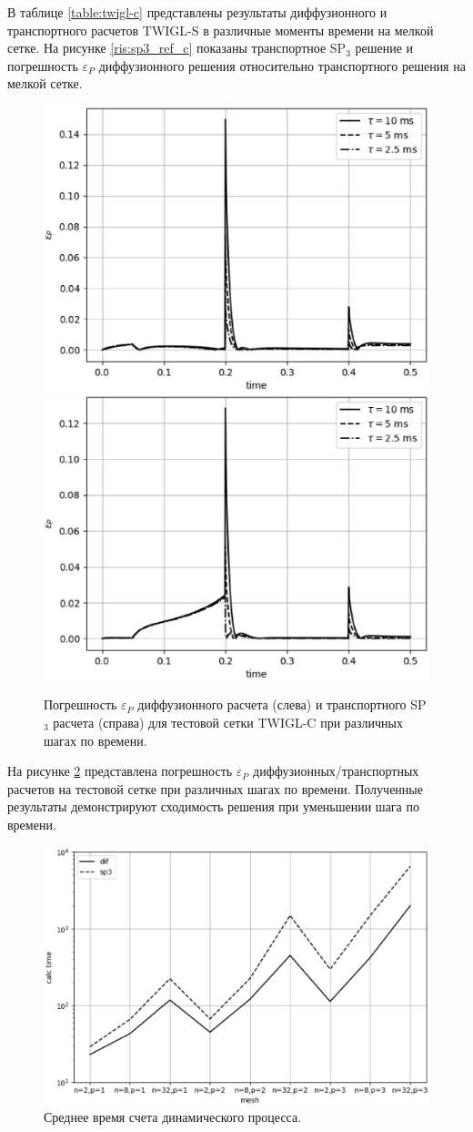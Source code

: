 \documentclass{crm-article}
\begin{document}
В таблице \ref{table:twigl-c} представлены результаты диффузионного и транспортного расчетов TWIGL-S в различные моменты времени на мелкой сетке.
На рисунке \ref{ris:sp3_ref_c} показаны транспортное SP$_3$ решение и погрешность $\varepsilon_P$ диффузионного решения относительно транспортного решения на мелкой сетке. 

\begin{figure}[ht]
\begin{center}
	\includegraphics[width=0.4\linewidth]{dif_tau_c.eps}\hspace{20pt}
	\includegraphics[width=0.4\linewidth]{sp3_tau_c.eps}\\
	\caption{\label{image:canonsummary} Погрешность $\varepsilon_P$ диффузионного расчета (слева) и  транспортного SP$_3$ расчета (справа) для тестовой сетки TWIGL-C при различных шагах по времени.}
	\label{ris:tau_c}
\end{center}
\end{figure}

На рисунке \ref{ris:tau_c} представлена погрешность $\varepsilon_P$ диффузионных/транспортных расчетов на тестовой сетке при различных шагах по времени. 
Полученные результаты демонстрируют сходимость решения при уменьшении шага по времени. 

\begin{figure}[h]
\begin{center}
	\includegraphics[width=0.7\linewidth]{calc_time.eps}
	\caption{\label{image:canonsummary} Среднее время счета динамического процесса.}
	\label{ris:tau_c}
\end{center}
\end{figure}
\end{document}
